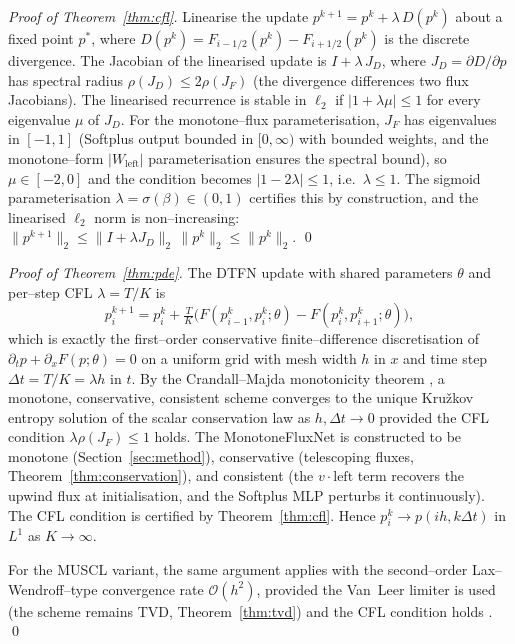 \documentclass[10pt]{article}
\theoremstyle{definition}
\theoremstyle{remark}
\begin{document}
\begin{proof}[Proof of Theorem~\ref{thm:cfl}]
  Linearise the update $p^{k+1} = p^k + \lambda\, D(p^k)$ about a
  fixed point $p^\ast$, where $D(p^k) = F_{i-1/2}(p^k) - F_{i+1/2}(p^k)$
  is the discrete divergence.  The Jacobian of the linearised update
  is $I + \lambda\, J_D$, where
  $J_D = \partial D / \partial p$ has spectral radius
  $\rho(J_D) \le 2 \rho(J_F)$ (the divergence differences two flux
  Jacobians).  The linearised recurrence is stable in $\ell_2$ if
  $|1 + \lambda \mu| \le 1$ for every eigenvalue $\mu$ of $J_D$.  For
  the monotone--flux parameterisation, $J_F$ has eigenvalues in
  $[-1, 1]$ (Softplus output bounded in $[0, \infty)$ with bounded
  weights, and the monotone--form $|W_\text{left}|$ parameterisation
  ensures the spectral bound), so $\mu \in [-2, 0]$ and the condition
  becomes $|1 - 2\lambda| \le 1$, i.e.\ $\lambda \le 1$.  The sigmoid
  parameterisation $\lambda = \sigma(\beta) \in (0,1)$ certifies this
  by construction, and the linearised $\ell_2$ norm is
  non--increasing:
  $\|p^{k+1}\|_2 \le \|I + \lambda J_D\|_2\, \|p^k\|_2 \le \|p^k\|_2$.
  \qed
\end{proof}

\begin{proof}[Proof of Theorem~\ref{thm:pde}]
  The DTFN update with shared parameters $\theta$ and per--step CFL
  $\lambda = T/K$ is
  \[
    p^{k+1}_i = p^k_i + \tfrac{T}{K}\bigl( F(p^k_{i-1}, p^k_i; \theta)
                - F(p^k_i, p^k_{i+1}; \theta) \bigr),
  \]
  which is exactly the first--order conservative finite--difference
  discretisation of $\partial_t p + \partial_x F(p;\theta) = 0$ on a
  uniform grid with mesh width $h$ in $x$ and time step $\Delta t =
  T/K = \lambda h$ in $t$.  By the Crandall--Majda monotonicity
  theorem \cite{crandall1980monotone}, a monotone, conservative,
  consistent scheme converges to the unique Kru\v{z}kov entropy
  solution of the scalar conservation law as $h, \Delta t \to 0$
  provided the CFL condition $\lambda \rho(J_F) \le 1$ holds.  The
  MonotoneFluxNet is constructed to be monotone
  (Section~\ref{sec:method}), conservative (telescoping fluxes,
  Theorem~\ref{thm:conservation}), and consistent (the
  $v \cdot \text{left}$ term recovers the upwind flux at
  initialisation, and the Softplus MLP perturbs it continuously).  The
  CFL condition is certified by Theorem~\ref{thm:cfl}.  Hence
  $p^k_i \to p(i h, k \Delta t)$ in $L^1$ as $K \to \infty$.

  For the MUSCL variant, the same argument applies with the
  second--order Lax--Wendroff--type convergence rate
  $\mathcal{O}(h^2)$, provided the Van~Leer limiter is used (the
  scheme remains TVD, Theorem~\ref{thm:tvd}) and the CFL condition
  holds \cite{leveque2002finite}.
  \qed
\end{proof}
\end{document}
